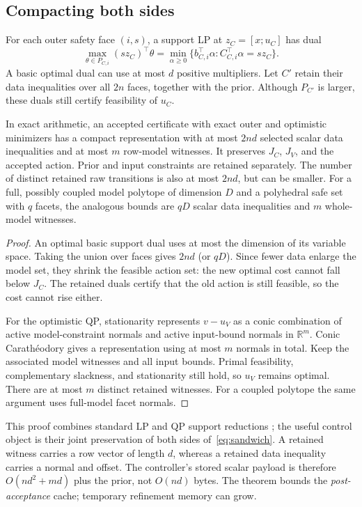 \documentclass{l4dc2026}
\newcommand{\R}{\mathbb{R}}
\begin{document}
\subsection{Compacting both sides}
For each outer safety face $(i,s)$, a support LP at $z_C=[x;u_C]$ has dual
\begin{equation}\label{eq:dualLP}
 \max_{\theta\in P_{C,i}}(s z_C)^\top\theta
 =\min_{\alpha\geq0}\{b_{C,i}^\top\alpha:C_{C,i}^\top\alpha=s z_C\}.
\end{equation}
A basic optimal dual can use at most $d$ positive multipliers. Let $C'$ retain their data inequalities over all $2n$ faces, together with the prior. Although $P_{C'}$ is larger, these duals still certify feasibility of $u_C$.

\begin{theorem}\label{thm:compact}
In exact arithmetic, an accepted certificate with exact outer and optimistic minimizers has a compact representation with at most $2nd$ selected scalar data inequalities and at most $m$ row-model witnesses. It preserves $J_C$, $J_V$, and the accepted action. Prior and input constraints are retained separately. The number of distinct retained raw transitions is also at most $2nd$, but can be smaller. For a full, possibly coupled model polytope of dimension $D$ and a polyhedral safe set with $q$ facets, the analogous bounds are $qD$ scalar data inequalities and $m$ whole-model witnesses.
\end{theorem}
\begin{proof}
An optimal basic support dual uses at most the dimension of its variable space. Taking the union over faces gives $2nd$ (or $qD$). Since fewer data enlarge the model set, they shrink the feasible action set: the new optimal cost cannot fall below $J_C$. The retained duals certify that the old action is still feasible, so the cost cannot rise either.

For the optimistic QP, stationarity represents $v-u_V$ as a conic combination of active model-constraint normals and active input-bound normals in $\R^m$. Conic Carath\'eodory gives a representation using at most $m$ normals in total. Keep the associated model witnesses and all input bounds. Primal feasibility, complementary slackness, and stationarity still hold, so $u_V$ remains optimal. There are at most $m$ distinct retained witnesses. For a coupled polytope the same argument uses full-model facet normals.
\end{proof}

This proof combines standard LP and QP support reductions \citep{boyd2004}; the useful control object is their joint preservation of both sides of~\eqref{eq:sandwich}. A retained witness carries a row vector of length $d$, whereas a retained data inequality carries a normal and offset. The controller's stored scalar payload is therefore $O(nd^2+md)$ plus the prior, not $O(nd)$ bytes. The theorem bounds the \emph{post-acceptance} cache; temporary refinement memory can grow.
\end{document}
